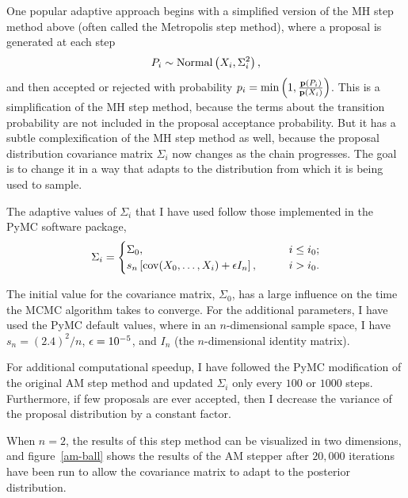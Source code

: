 One popular adaptive approach begins with a simplified version of the MH
step method above (often called the Metropolis step method), where a
proposal is generated at each step
\[
P_i \sim \operatorname{Normal}\left(X_i, \Sigma^2_i\right),
\]
and then accepted or rejected with probability $p_i = \min\left(1,
\frac{\mathbf{p}(P_i)}{\mathbf{p}(X_i)}\right)$.  This is a simplification of
the MH step method, because the terms about the transition probability
are not included in the proposal acceptance probability.  But it has a
subtle complexification of the MH step method as well, because the
proposal distribution covariance matrix $\Sigma_i$ now changes
as the chain progresses.  The goal is to change it in a way that
adapts to the distribution from which it is being used to sample.

The adaptive values of $\Sigma_i$ that I have used follow those
implemented in the PyMC software package,\cite{patil_pymc:_2010}
\[
\Sigma_i = \begin{cases}
\Sigma_0, &\qquad i \leq i_0;\\
s_n \left[\operatorname{cov}(X_0, \ldots, X_i) + \epsilon I_n\right], &\qquad i > i_0.
\end{cases}
\]

The initial value for the covariance matrix, $\Sigma_0$, has a large
influence on the time the MCMC algorithm takes to converge.
For the additional parameters, I have used the PyMC default values,
where in an $n$-dimensional sample space, I have $s_n = (2.4)^2/n$, $\epsilon
= 10^{-5}$, and $I_n$ (the $n$-dimensional identity matrix).

For additional computational speedup, I have followed the PyMC
modification of the original AM step method and updated $\Sigma_i$ only every
$100$ or $1000$ steps.  Furthermore, if few proposals are
ever accepted, then I decrease the variance of the
proposal distribution by a constant factor.

When $n=2$, the results of this step method can be visualized in two
dimensions, and figure~\ref{am-ball} shows the results of the AM
stepper after $20,000$ iterations have been run to allow the covariance
matrix to adapt to the posterior distribution.

